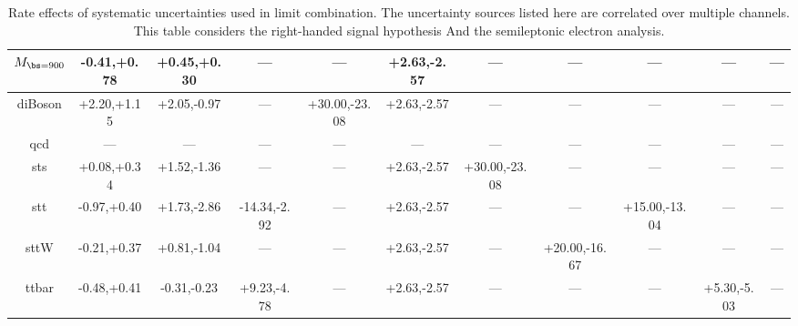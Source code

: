 \begin{table}
\begin{center}
\begin{small}
{\begin{tabular}{|c||cccccccccc|}
\hline 
$M_{\bs=900}$ & -0.41,+0.78 & +0.45,+0.30 & --- & --- & +2.63,-2.57 & --- & --- & --- & --- & ---\\ 
\hline 
diBoson & +2.20,+1.15 & +2.05,-0.97 & --- & +30.00,-23.08 & +2.63,-2.57 & --- & --- & --- & --- & ---\\ 
\hline 
qcd & --- & --- & --- & --- & --- & --- & --- & --- & --- & ---\\ 
\hline 
sts & +0.08,+0.34 & +1.52,-1.36 & --- & --- & +2.63,-2.57 & +30.00,-23.08 & --- & --- & --- & ---\\ 
\hline 
stt & -0.97,+0.40 & +1.73,-2.86 & -14.34,-2.92 & --- & +2.63,-2.57 & --- & --- & +15.00,-13.04 & --- & ---\\ 
\hline 
sttW & -0.21,+0.37 & +0.81,-1.04 & --- & --- & +2.63,-2.57 & --- & +20.00,-16.67 & --- & --- & ---\\ 
\hline 
ttbar & -0.48,+0.41 & -0.31,-0.23 & +9.23,-4.78 & --- & +2.63,-2.57 & --- & --- & --- & +5.30,-5.03 & ---\\ 
\hline
\end{tabular}
}
\caption{Rate effects of systematic uncertainties used in limit combination.  The uncertainty sources listed here are correlated over multiple channels.  This table considers the right-handed signal hypothesis
And the semileptonic electron analysis.}
\label{table:bsRsysCoSe}

\end{small}
\end{center}
\end{table}




